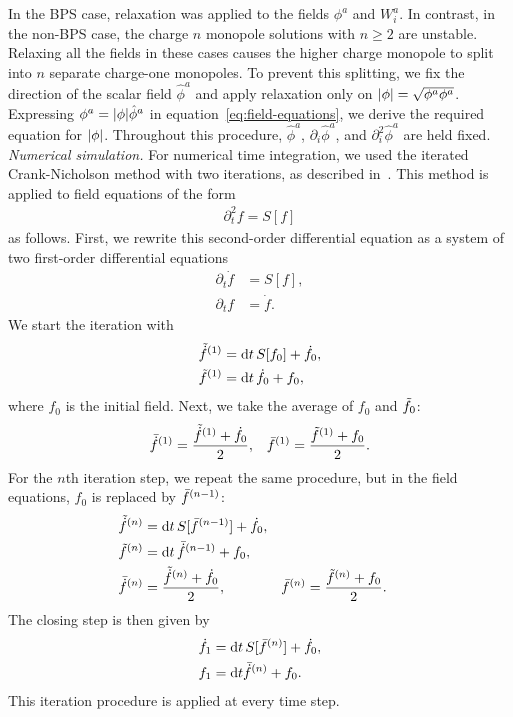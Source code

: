\documentclass[aps, prd, twocolumn, superscriptaddress, preprintnumbers, nofootinbib, longbibliography]{revtex4-1}
\begin{document}
In the BPS case, relaxation was applied to the fields $\phi^a$ and $W_i^a$. In contrast, in the non-BPS case, the charge $n$ monopole solutions with $n\geq 2$ are unstable. Relaxing all the fields in these cases causes the higher charge monopole to split into $n$ separate charge-one monopoles. To prevent this splitting, we fix the direction of the scalar field $\hat{\phi}^a$ and apply relaxation only on $\abs{\phi}=\sqrt{\phi^a \phi^a}$.
Expressing $\phi^a=\abs{\phi}\hat{\phi}^a$ in equation~\eqref{eq:field-equations}, we derive the required equation for $\abs{\phi}$. Throughout this procedure, $\hat{\phi}^a$, $\partial_i \hat{\phi}^a$, and $\partial_i^2 \hat{\phi}^a$ are held fixed.\\







\textit{Numerical simulation.}
For numerical time integration, we used the iterated Crank-Nicholson method with two iterations, as described in~\cite{Teukolsky:1999rm}. This method is applied to field equations of the form
\begin{align} 
    \partial_t^2 f = S[f] 
\end{align}
as follows.
First, we rewrite this second-order differential equation as a system of two first-order differential equations
\begin{align*}
    \partial_t \dot{f}&=S[f],\\
    \partial_t f&=\dot{f}.
\end{align*}
We start the iteration with 
\begin{align*}
    \Tilde{\dot{f}}^{(1)}&=\dd t\, S[f_0]+\dot{f}_0,\\
    \Tilde{f}^{(1)}&=\dd t\, \dot{f}_0+f_0, 
\end{align*}
where $f_0$ is the initial field. Next, we take the average of $f_0$ and $\Tilde{f}_0$:
\begin{align*}
    \Bar{\dot{f}}^{(1)}=\frac{\Tilde{\dot{f}}^{(1)}+\dot{f}_0}{2},&& \Bar{f}^{(1)}=\frac{\Tilde{f}^{(1)}+f_0}{2}.
\end{align*}
For the $n$th iteration step, we repeat the same procedure, but in the field equations, $f_0$ is replaced by $\Bar{f}^{(n-1)}$:
\begin{align*}
    \Tilde{\dot{f}}^{(n)}&=\dd t\, S[\Bar{f}^{(n-1)}]+\dot{f}_0,\\
    \Tilde{f}^{(n)}&=\dd t\, \Bar{\dot{f}}^{(n-1)}+f_0, \\
\Bar{\dot{f}}^{(n)}&=\frac{\Tilde{\dot{f}}^{(n)}+\dot{f}_0}{2},&& \Bar{f}^{(n)}=\frac{\Tilde{f}^{(n)}+f_0}{2}.
\end{align*}
The closing step is then given by
\begin{align*}
    \dot{f}_1&=\dd t \, S[\Bar{f}^{(n)}]+\dot{f}_0,\\
    f_1&=\dd t \Bar{\dot{f}}^{(n)}+f_0.
\end{align*}
This iteration procedure is applied at every time step.
\end{document}
